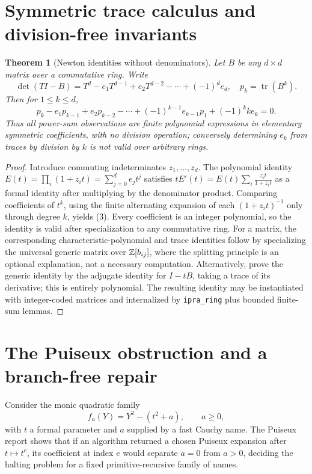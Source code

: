 \documentclass[11pt]{article}
\newtheorem{theorem}{Theorem}[section]
\newcommand{\Tr}{\operatorname{tr}}\newcommand{\Res}{\operatorname{Res}}
\begin{document}
\section{Symmetric trace calculus and division-free invariants}
\begin{theorem}[Newton identities without denominators]
Let \(B\) be any \(d\times d\) matrix over a commutative ring. Write
\[\det(TI-B)=T^d-e_1T^{d-1}+e_2T^{d-2}-\cdots+(-1)^de_d,\quad p_k=\Tr(B^k).\]
Then for \(1\le k\le d\),
\[
 p_k-e_1p_{k-1}+e_2p_{k-2}-\cdots+(-1)^{k-1}e_{k-1}p_1+(-1)^k k e_k=0.\tag{3}
\]
Thus all power-sum observations are finite polynomial expressions in elementary symmetric coefficients, with no division operation; conversely determining \(e_k\) from traces by division by \(k\) is \emph{not} valid over arbitrary rings.
\end{theorem}
\begin{proof}
Introduce commuting indeterminates \(z_1,\ldots,z_d\). The polynomial identity
\(E(t)=\prod_i(1+z_it)=\sum_{j=0}^d e_jt^j\) satisfies
\(tE'(t)=E(t)\sum_i\frac{z_it}{1+z_it}\) as a formal identity after multiplying by the denominator product. Comparing coefficients of \(t^k\), using the finite alternating expansion of each \((1+z_it)^{-1}\) only through degree \(k\), yields (3). Every coefficient is an integer polynomial, so the identity is valid after specialization to any commutative ring. For a matrix, the corresponding characteristic-polynomial and trace identities follow by specializing the universal generic matrix over \(\mathbb Z[b_{ij}]\), where the splitting principle is an optional explanation, not a necessary computation. Alternatively, prove the generic identity by the adjugate identity for \(I-tB\), taking a trace of its derivative; this is entirely polynomial. The resulting identity may be instantiated with integer-coded matrices and internalized by \texttt{ipra\_ring} plus bounded finite-sum lemmas.
\end{proof}

\section{The Puiseux obstruction and a branch-free repair}
Consider the monic quadratic family
\[f_a(Y)=Y^2-(t^2+a),\qquad a\ge0,\]
with \(t\) a formal parameter and \(a\) supplied by a fast Cauchy name. The Puiseux report shows that if an algorithm returned a chosen Puiseux expansion after \(t\mapsto t^e\), its coefficient at index \(e\) would separate \(a=0\) from \(a>0\), deciding the halting problem for a fixed primitive-recursive family of names.
\end{document}
